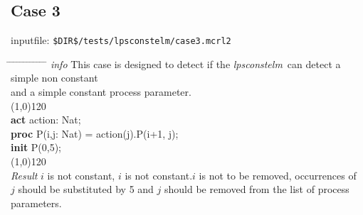 \index{}\documentclass[a4paper,10pt]{article}
\theoremstyle{plain}
\theoremstyle{definition}
\newcommand{\tool}{\textit{lpsconstelm}}
\newcommand{\pp}{process parameter}
\newcommand{\pps}{process parameters}
\newcommand{\ti}{\textit}
\newcommand{\tb}{\textbf}
\newcommand{\tabw}{\hspace*{15.mm} \= \hspace*{20.mm} \= \hspace*{5.mm} \= \hspace*{5.mm} \= \hspace*{5.mm} \= \hspace*{5.mm}  \= \hspace*{5.mm}  \= \hspace*{5.mm}  \= \hspace*{5.mm} \= \hspace*{5.mm} \= \hspace*{5.mm}  \= \hspace*{5.mm}  \= \hspace*{5.mm}\kill}
\begin{document}
\subsection*{Case 3}
inputfile: \verb"$DIR$/tests/lpsconstelm/case3.mcrl2"
\begin{tabbing}
\tabw
\ti{info}
\> This case is designed to detect if the \tool\ can detect a simple non constant \\
\> and a simple constant \pp .\\
\line(1,0){120}\\
\tb{act}  \> action: Nat;\\
\tb{proc} \> P(i,j: Nat) \> = \> action(j).P(i+1, j);\\
\tb{init} \> P(0,5);\\
\line(1,0){120}\\
\ti{Result} \> $i$ is not constant, $i$ is not constant.$i$ is not to be removed, occurrences of \\
\> $j$ should be substituted by 5 and $j$ should be removed from the list of \pps .\\
\end{tabbing}
\end{document}
